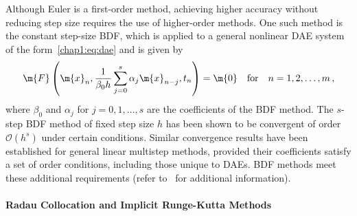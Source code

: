 Although Euler is a first-order method, achieving higher accuracy without reducing step size requires the use of higher-order methods. One such method is the constant step-size \ac{BDF}, which is applied to a general nonlinear \ac{DAE} system of the form~\eqref{chap1:eq:dae} and is given by
%
\begin{equation*}
  \m{F}\left(\m{x}_n, \dfrac{1}{\beta_0 h} \sum_{j=0}^{s} \alpha_j \m{x}_{n-j}, t_n\right) = \m{0} \quad \text{for} \quad n = 1, 2, \dots, m \, \text{,}
\end{equation*}
%
where $\beta_0$ and $\alpha_j$ for $j = 0, 1, \dots, s$ are the coefficients of the \ac{BDF} method. The $s$-step \ac{BDF} method of fixed step size $h$ has been shown to be convergent of order $\mathcal{O}(h^s)$ under certain conditions. Similar convergence results have been established for general linear multistep methods, provided their coefficients satisfy a set of order conditions, including those unique to \acp{DAE}. \ac{BDF} methods meet these additional requirements (refer to~\cite{brenan1995numerical} for additional information).

\paragraph{Radau Collocation and Implicit Runge-Kutta Methods}

